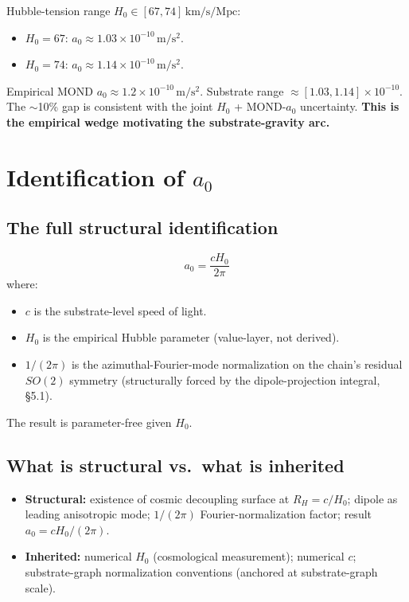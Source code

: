 \documentclass[11pt,a4paper]{article}
\begin{document}
Hubble-tension range $H_0 \in [67, 74]\,\mathrm{km/s/Mpc}$:

\begin{itemize}[noitemsep]
\item $H_0 = 67$: $a_0 \approx 1.03 \times 10^{-10}\,\mathrm{m/s^2}$.
\item $H_0 = 74$: $a_0 \approx 1.14 \times 10^{-10}\,\mathrm{m/s^2}$.
\end{itemize}

Empirical MOND $a_0 \approx 1.2 \times 10^{-10}\,\mathrm{m/s^2}$. Substrate range $\approx [1.03, 1.14] \times 10^{-10}$. The $\sim$10\% gap is consistent with the joint $H_0$ + MOND-$a_0$ uncertainty. \textbf{This is the empirical wedge motivating the substrate-gravity arc.}

\section{Identification of $a_0$}

\subsection{The full structural identification}

\[
\boxed{a_0 = \frac{cH_0}{2\pi}}
\]
where:

\begin{itemize}[noitemsep]
\item $c$ is the substrate-level speed of light.
\item $H_0$ is the empirical Hubble parameter (value-layer, not derived).
\item $1/(2\pi)$ is the azimuthal-Fourier-mode normalization on the chain's residual $SO(2)$ symmetry (structurally forced by the dipole-projection integral, \S5.1).
\end{itemize}

The result is parameter-free given $H_0$.

\subsection{What is structural vs.\ what is inherited}

\begin{itemize}[noitemsep]
\item \textbf{Structural:} existence of cosmic decoupling surface at $R_H = c/H_0$; dipole as leading anisotropic mode; $1/(2\pi)$ Fourier-normalization factor; result $a_0 = cH_0/(2\pi)$.
\item \textbf{Inherited:} numerical $H_0$ (cosmological measurement); numerical $c$; substrate-graph normalization conventions (anchored at substrate-graph scale).
\end{itemize}
\end{document}
